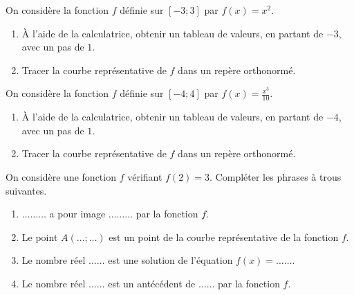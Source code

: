 \documentclass[11pt]{article}
\begin{document}
\begin{exo}
On considère la fonction $f$ définie sur $[-3;3]$ par
$f(x)=x^2$.
\begin{enumerate}
  \item À l'aide de la calculatrice, obtenir un tableau de valeurs, en partant
    de $-3$, avec un pas de $1$.
  \item Tracer la courbe représentative de $f$ dans un repère orthonormé.
\end{enumerate}
\end{exo}

\begin{exo}
On considère la fonction $f$ définie sur $[-4;4]$ par
$f(x)=\frac{x^3}{10}$.
\begin{enumerate}
  \item À l'aide de la calculatrice, obtenir un tableau de valeurs, en partant
    de $-4$, avec un pas de $1$.
  \item Tracer la courbe représentative de $f$ dans un repère orthonormé.
\end{enumerate}
\end{exo}

\begin{exo}
On considère une fonction $f$ vérifiant $f(2)=3$.
Compléter les phrases à trous suivantes.
\begin{enumerate}
  \item $\dots\dots\dots$ a pour image $\dots\dots\dots$ par la fonction $f$.
  \item Le point $A(\dots;\dots)$ est un point de la courbe représentative de la
    fonction $f$.
  \item Le nombre réel $\dots\dots$ est une solution de l'équation
    $f(x)=\dots\dots$.
  \item Le nombre réel $\dots\dots$ est un antécédent de $\dots\dots$ par la
    fonction $f$.
\end{enumerate}
\end{exo}
\end{document}
